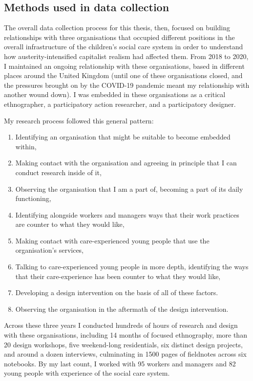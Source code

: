 \subsection{Methods used in data collection}
The overall data collection process for this thesis, then, focused on building relationships with three organisations that occupied different positions in the overall infrastructure of the children's social care system in order to understand how austerity-intensified capitalist realism had affected them. From 2018 to 2020, I maintained an ongoing relationship with these organisations, based in different places around the United Kingdom (until one of these organisations closed, and the pressures brought on by the COVID-19 pandemic meant my relationship with another wound down). I was embedded in these organisations as a critical ethnographer, a participatory action researcher, and a participatory designer.

My research process followed this general pattern:
\begin{enumerate}
\item Identifying an organisation that might be suitable to become embedded within,
\item Making contact with the organisation and agreeing in principle that I can conduct research inside of it,
\item Observing the organisation that I am a part of, becoming a part of its daily functioning,
\item Identifying alongside workers and managers ways that their work practices are counter to what they would like,
\item Making contact with care-experienced young people that use the organisation's services,
\item Talking to care-experienced young people in more depth, identifying the ways that their care-experience has been counter to what they would like,
\item Developing a design intervention on the basis of all of these factors.
\item Observing the organisation in the aftermath of the design intervention.
\end{enumerate}

Across these three years I conducted hundreds of hours of research and design with these organisations, including 14 months of focused ethnography, more than 20 design workshops, five weekend-long residentials, six distinct design projects, and around a dozen interviews, culminating in 1500 pages of fieldnotes across six notebooks. By my last count, I worked with 95 workers and managers and 82 young people with experience of the social care system. 

